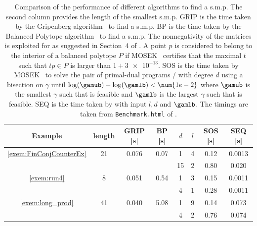 \documentclass[11pt,twoside,a4paper,openright]{uclouvain-thesis}
\begin{document}
\begin{table}
  \centering
  \begin{tabular}{|cc|c|c|cccc|}
    \hline
    Example                     & length & GRIP [s] & BP [s] & $d$ & $l$ & SOS [s] & SEQ [s]\\
    \hline
    \ref{exem:FinConjCounterEx} & 21 & 0.076    & 0.07  & 1   & 4   & 0.12    & 0.0013\\
                                &    &          &       & 15  & 2   & 0.80    & 0.020\\
    \hline
    \ref{exem:run4}             & 8  & 0.051    & 0.54  & 1   & 3   & 0.15    & 0.0011\\
                                &    &          &       & 4   & 1   & 0.28    & 0.0011\\
    \hline
    \ref{exem:long_prod}        & 41 & 0.040    & 5.08  & 1   & 9   & 0.14    & 0.073\\
                                &    &          &       & 4   & 2   & 0.76    & 0.074\\
    \hline
  \end{tabular}
  \caption{Comparison of the performance of different algorithms to find a s.m.p.
  The second column provides the length of the smallest s.m.p.
  GRIP is the time taken by the Gripenberg algorithm~\cite{gripenberg1996computing} to find a s.m.p.
  BP is the time taken by the Balanced Polytope algorithm~\cite{guglielmi2013exact} to
  find a s.m.p.
  The nonnegativity of the matrices is exploited for  as
  suggested in Section~4 of \cite{guglielmi2013exact}.
  A point $p$ is considered to belong to the interior of a balanced polytope $P$ if MOSEK~\cite{mosek2017mosek81082} certifies that the maximal $t$ such that $tp \in P$ is larger than $1 + \num{3e-13}$.
  SOS is the time taken by MOSEK~\cite{mosek2017mosek81082} to solve the pair of primal-dual programs / with degree $d$ using a bisection on $\gamma$ until $\log(\gamub) - \log(\gamlb) < \num{1e-2}$ where $\gamub$ is the smallest $\gamma$ such that  is feasible and $\gamlb$ is the largest $\gamma$ such that  is feasible.
  SEQ is the time taken by  with input $l, d$ and $\gamlb$.
  The timings are taken from \texttt{Benchmark.html} of \cite{5f757996-cc62-479c-86f3-eac76e3e9580}.}
  \label{tab:benchlb}
\end{table}
\end{document}
